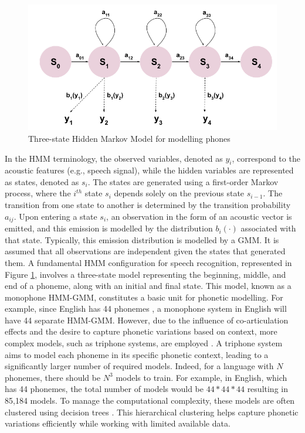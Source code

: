 \begin{figure}
    \begin{center}
    \includegraphics[scale=0.3]{imgs/HMM_monophone.png}
    \caption{Three-state Hidden Markov Model for modelling phones}
    \label{HMM_monophone}    
    \end{center}
\end{figure}
In the \ac{HMM} terminology, the observed variables, denoted as $y_i$, correspond to the acoustic features (e.g., speech signal), while the hidden variables are represented as states, denoted as $s_i$. The states are generated using a first-order Markov process, where the $i^{th}$ state $s_i$ depends solely on the previous state $s_{i-1}$. The transition from one state to another is determined by the transition probability $a_{ij}$. Upon entering a state $s_i$, an observation in the form of an acoustic vector is emitted, and this emission is modelled by the distribution $b_i(\cdot)$ associated with that state. Typically, this emission distribution is modelled by a \ac{GMM}. It is assumed that all observations are independent given the states that generated them. A fundamental \ac{HMM} configuration for speech recognition, represented in Figure \ref{HMM_monophone}, involves a three-state model representing the beginning, middle, and end of a phoneme, along with an initial and final state. This model, known as a monophone \ac{HMM-GMM}, constitutes a basic unit for phonetic modelling. For example, since English has 44 phonemes \cite{bizzocchi2017many}, a monophone system in English will have 44 separate \ac{HMM-GMM}. However, due to the influence of co-articulation effects and the desire to capture phonetic variations based on context, more complex models, such as triphone systems, are employed \cite{schwartz1985context}. A triphone system aims to model each phoneme in its specific phonetic context, leading to a significantly larger number of required models.  Indeed, for a language with $N$ phonemes, there should be $N^3$ models to train. For example, in English, which has 44 phonemes, the total number of models would be  $44 * 44 * 44$ resulting in 85,184 models. To manage the computational complexity, these models are often clustered using decision trees \cite{bahl1991context}. This hierarchical clustering helps capture phonetic variations efficiently while working with limited available data.

